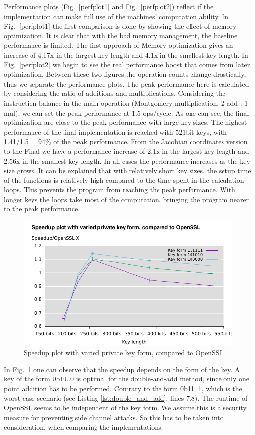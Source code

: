 Performance plots (Fig.~\ref{perfplot1} and Fig.~\ref{perfplot2}) reflect if the implementation can make full use of the machines' computation ability. In Fig.~\ref{perfplot1} the first comparison is done by showing the effect of memory optimization. It is clear that with the bad memory management, the baseline performance is limited. The first approach of Memory optimization gives an increase of 4.17x in the largest key length and 4.1x in the smallest key length. In Fig.~\ref{perfplot2} we begin to see the real performance boost that comes from later optimization. Between these two figures the operation counts change drastically, thus we separate the performance plots. The peak performance here is calculated by considering the ratio of additions and multiplications. Considering the instruction balance in the main operation (Montgomery multiplication, 2 add : 1 mul), we can set the peak performance at 1.5 ops/cycle. As one can see, the final optimization are close to the peak performance with large key sizes. The highest performance of the final implementation is reached with $521$bit keys, with 1.41/1.5 = 94\% of the peak performance. From the Jacobian coordinates version to the Final we have a performance increase of 2.1x in the largest key length and 2.56x in the smallest key length. In all cases the performance increases as the key size grows. It can be explained that with relatively short key sizes, the setup time of the functions is relatively high compared to the time spent in the calculation loops. This prevents the program from reaching the peak performance. With longer keys the loops take most of the computation, bringing the program nearer to the peak performance.
\begin{figure}[h!]\centering
  \includegraphics[scale=0.7]{keysize}
  \caption{Speedup plot with varied private key form, compared to OpenSSL\label{keysize}}
\end{figure}

In Fig.~\ref{keysize} one can observe that the speedup depends on the form of the key. A key of the form 0b10..0 is optimal for the double-and-add method, since only one point addition has to be performed. Contrary to the form 0b11..1, which is the worst case scenario (see Listing \ref{lst:double_and_add}, lines 7,8). The runtime of OpenSSL seems to be independent of the key form. We assume this is a security measure for preventing side channel attacks. So this has to be taken into consideration, when comparing the implementations.